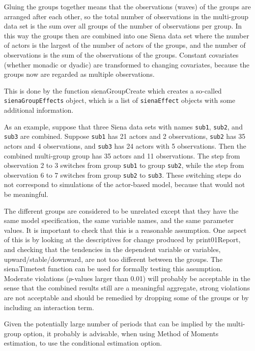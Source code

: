 \documentclass[a4paper,fleqn,11pt]{article}
\newcommand{\+}{\, + \,}
\begin{document}
Gluing the groups together means that the observations (waves) of the groups
are arranged after each other, so the total number of observations
in the multi-group data set is the sum over all groups of the
number of observations per group. In this way
the groups then are combined into one Siena data set
where the number of actors is the largest of the number of
actors of the groups, and the number of observations
is the sum of the observations of the groups.
Constant covariates (whether monadic or dyadic) are transformed
to changing covariates, because the groups now are regarded
as multiple observations.

This is done by the function \textsf{sienaGroupCreate} which creates
a so-called \texttt{sienaGroupEffects} object, which is a list of
\texttt{sienaEffect} objects with some additional information.

As an example, suppose that three Siena data sets with names {\tt sub1}, {\tt sub2},
and {\tt sub3} are combined. Suppose {\tt sub1} has 21 actors and
2 observations, {\tt sub2} has 35 actors and 4 observations,
and {\tt sub3} has 24 actors with 5 observations.
Then the combined multi-group group has 35 actors and 11 observations.
The step from observation 2 to 3 switches from group {\tt sub1}
to group {\tt sub2}, while
the step from observation 6 to 7 switches from group {\tt sub2}
to {\tt sub3}. These switching steps do not correspond to simulations
of the actor-based model, because that would not be meaningful.

The different groups are considered to be unrelated
except that they have the same model specification,
the same variable names, and the same parameter values.
It is important to check that this is a reasonable assumption.
One aspect of this is by looking at the descriptives for change
produced by \textsf{print01Report}, and checking that the
tendencies in the dependent variable or variables, upward/stable/downward,
are not too different between the groups.
The \textsf{sienaTimetest} function can be used for
formally testing this assumption.
Moderate violations ($p$-values larger than 0.01) will probably
be acceptable in the sense that the combined results
still are a meaningful aggregate, strong violations are not acceptable
and should be remedied by dropping some of the groups or by
including an interaction term.

Given the potentially large number of periods that can be implied
by the multi-group option, it probably is advisable,
when using Method of Moments estimation, to use
the conditional estimation option.
\end{document}
